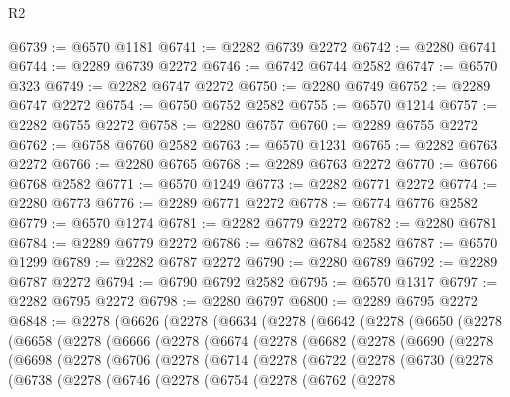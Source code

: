 \begin{lexlean}{R2}
\begin{coremodule}
@6739 := @6570 @1181
@6741 := @2282 @6739 @2272
@6742 := @2280 @6741
@6744 := @2289 @6739 @2272
@6746 := @6742 @6744 @2582
@6747 := @6570 @323
@6749 := @2282 @6747 @2272
@6750 := @2280 @6749
@6752 := @2289 @6747 @2272
@6754 := @6750 @6752 @2582
@6755 := @6570 @1214
@6757 := @2282 @6755 @2272
@6758 := @2280 @6757
@6760 := @2289 @6755 @2272
@6762 := @6758 @6760 @2582
@6763 := @6570 @1231
@6765 := @2282 @6763 @2272
@6766 := @2280 @6765
@6768 := @2289 @6763 @2272
@6770 := @6766 @6768 @2582
@6771 := @6570 @1249
@6773 := @2282 @6771 @2272
@6774 := @2280 @6773
@6776 := @2289 @6771 @2272
@6778 := @6774 @6776 @2582
@6779 := @6570 @1274
@6781 := @2282 @6779 @2272
@6782 := @2280 @6781
@6784 := @2289 @6779 @2272
@6786 := @6782 @6784 @2582
@6787 := @6570 @1299
@6789 := @2282 @6787 @2272
@6790 := @2280 @6789
@6792 := @2289 @6787 @2272
@6794 := @6790 @6792 @2582
@6795 := @6570 @1317
@6797 := @2282 @6795 @2272
@6798 := @2280 @6797
@6800 := @2289 @6795 @2272
@6848 := @2278
    (@6626
      (@2278
        (@6634
          (@2278
            (@6642
              (@2278
                (@6650
                  (@2278
                    (@6658
                      (@2278
                        (@6666
                          (@2278
                            (@6674
                              (@2278
                                (@6682
                                  (@2278
                                    (@6690
                                      (@2278
                                        (@6698
                                          (@2278
                                            (@6706
                                              (@2278
                                                (@6714
                                                  (@2278
                                                    (@6722
                                                      (@2278
                                                        (@6730
                                                          (@2278
                                                            (@6738
                                                              (@2278
                                                                (@6746
                                                                  (@2278
                                                                    (@6754
                                                                      (@2278
                                                                        (@6762
                                                                          (@2278

\end{coremodule}
\end{lexlean}
